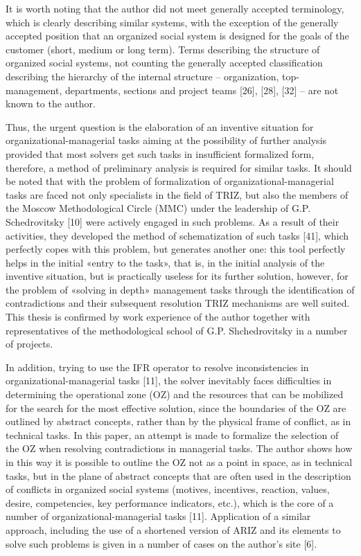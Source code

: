 \documentclass[11pt,a4paper]{book}
\begin{document}
It is worth noting that the author did not meet generally accepted
terminology, which is clearly describing similar systems, with the exception
of the generally accepted position that an organized social system is designed
for the goals of the customer (short, medium or long term). Terms describing
the structure of organized social systems, not counting the generally accepted
classification describing the hierarchy of the internal structure --
organization, top-management, departments, sections and project teams [26],
[28], [32] -- are not known to the author.

Thus, the urgent question is the elaboration of an inventive situation for
organizational-managerial tasks aiming at the possibility of further analysis
provided that most solvers get such tasks in insufficient formalized form,
therefore, a method of preliminary analysis is required for similar tasks. It
should be noted that with the problem of formalization of
organizational-managerial tasks are faced not only specialists in the field of
TRIZ, but also the members of the Moscow Methodological Circle (MMC) under the
leadership of G.P. Schedrovitsky [10] were actively engaged in such problems.
As a result of their activities, they developed the method of schematization
of such tasks [41], which perfectly copes with this problem, but generates
another one: this tool perfectly helps in the initial «entry to the task»,
that is, in the initial analysis of the inventive situation, but is
practically useless for its further solution, however, for the problem of
«solving in depth» management tasks through the identification of
contradictions and their subsequent resolution TRIZ mechanisms are well
suited. This thesis is confirmed by work experience of the author together
with representatives of the methodological school of G.P. Shchedrovitsky in a
number of projects.

In addition, trying to use the IFR operator to resolve inconsistencies in
organizational-managerial tasks [11], the solver inevitably faces difficulties
in determining the operational zone (OZ) and the resources that can be
mobilized for the search for the most effective solution, since the boundaries
of the OZ are outlined by abstract concepts, rather than by the physical frame
of conflict, as in technical tasks. In this paper, an attempt is made to
formalize the selection of the OZ when resolving contradictions in managerial
tasks.  The author shows how in this way it is possible to outline the OZ not
as a point in space, as in technical tasks, but in the plane of abstract
concepts that are often used in the description of conflicts in organized
social systems (motives, incentives, reaction, values, desire, competencies,
key performance indicators, etc.), which is the core of a number of
organizational-managerial tasks [11]. Application of a similar approach,
including the use of a shortened version of ARIZ and its elements to solve
such problems is given in a number of cases on the author’s site [6].
\end{document}
